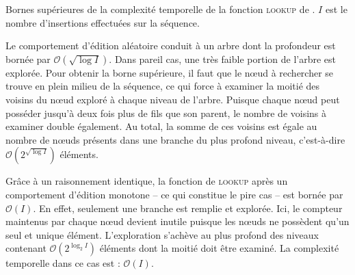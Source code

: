 \begin{table}
  \begin{center}
    \caption[Bornes supérieures de la complexité temporelle du
    \textsc{lookup} de \LSEQ] {\label{repl:table:lseqlookup} Bornes supérieures
      de la complexité temporelle de la fonction \textsc{lookup} de \LSEQ.
      $I$ est le nombre d'insertions effectuées sur la séquence.}
    
  \end{center}
\end{table}

\noindent Le comportement d'édition aléatoire conduit à un arbre dont la
profondeur est bornée par $\mathcal{O}(\sqrt{\log I})$. Dans pareil cas, une
très faible portion de l'arbre est explorée. Pour obtenir la borne supérieure,
il faut que le nœud à rechercher se trouve en plein milieu de la séquence, ce
qui force à examiner la moitié des voisins du nœud exploré à chaque niveau de
l'arbre. Puisque chaque nœud peut posséder jusqu'à deux fois plus de fils que
son parent, le nombre de voisins à examiner double également. Au total, la somme
de ces voisins est égale au nombre de nœuds présents dans une branche du plus
profond niveau, c'est-à-dire $\mathcal{O}(2^{\sqrt{\log I}})$ éléments.

\noindent Grâce à un raisonnement identique, la fonction de \textsc{lookup} après
un comportement d'édition monotone -- ce qui constitue le pire cas -- est bornée
par $\mathcal{O}(I)$. En effet, seulement une branche est remplie et
explorée. Ici, le compteur maintenus par chaque nœud devient inutile puisque les
nœuds ne possèdent qu'un seul et unique élément. L'exploration s'achève au plus
profond des niveaux contenant $\mathcal{O}(2^{\log_2 I})$ éléments dont la
moitié doit être examiné. La complexité temporelle dans ce cas est :
$\mathcal{O}(I)$.

